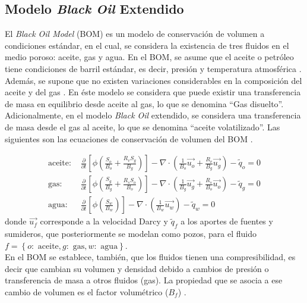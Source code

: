 \subsection[Modelo \emph{Black Oil} Extendido]{Modelo {\normalfont \bfseries \itshape Black Oil} Extendido}\label{subsec:BOM}

El \textit{Black Oil Model} (BOM) es un modelo de conservación de volumen a condiciones estándar, en el cual, se considera la existencia de tres fluidos en el medio poroso: aceite, gas y agua. En el BOM, se asume que el aceite o petróleo tiene condiciones de barril estándar, es decir, presión y temperatura atmosférica \citep{chen2007reservoir}. Además, se supone que no existen variaciones considerables en la composición del aceite y del gas \citep{jamal2006petroleum, chen2007reservoir, ertekin2001basic}. En éste modelo se considera que puede existir una transferencia de masa en equilibrio desde aceite al gas, lo que se denomina ``Gas disuelto''. Adicionalmente, en el modelo \textit{Black Oil} extendido, se considera una transferencia de masa desde el gas al aceite, lo que se denomina ``aceite volatilizado''. Las siguientes son las ecuaciones de conservación de volumen del BOM \citep{jamal2006petroleum, chen2007reservoir, ertekin2001basic}.

\begin{align}
\label{ec:aceite}
\text{aceite: }&\frac{\partial}{\partial t} \left[ \phi \left( \frac{S_{o}}{B_{o}} + \frac{R_{v} S_{g}}{B_{g}} \right) \right]
- \nabla \cdot \left( \frac{1}{B_{o}} \vec{u_{o}} + \frac{R_{v}}{B_{g}} \vec{u_{g}} \right) - \tilde{q}_{o}=0  \\
\label{ec:gas}
\text{gas: }&\frac{\partial}{\partial t} \left[ \phi \left( \frac{S_{g}}{B_{g}} + \frac{R_{s} S_{o}}{B_{o}} \right) \right]
- \nabla \cdot \left( \frac{1}{B_{g}} \vec{u_{g}} + \frac{R_{s}}{B_{o}} \vec{u_{o}} \right) - \tilde{q}_{g} = 0 \\
\label{ec:agua}
\text{agua: }&\frac{\partial}{\partial t} \left[\phi \left( \frac{S_{w}}{B_{w}} \right) \right] - \nabla \cdot \left( \frac{1}{B_{w}} \vec{u_{w}} \right) - \tilde{q}_{w} = 0 
\end{align}
donde $\vec{u_{f}}$ corresponde a la velocidad Darcy y $\tilde{q}_{f}$ a los aportes de fuentes y sumideros, que posteriormente se modelan como pozos, para el fluido $f = \left\lbrace o:\text{ aceite}, g:\text{ gas}, w:\text{ agua} \right\rbrace $.\\

En el BOM se establece, también, que los fluidos tienen una compresibilidad, es decir que cambian su volumen y densidad debido a cambios de presión o transferencia de masa a otros fluidos (gas). La propiedad que se asocia a ese cambio de volumen es el factor volumétrico ($B_{f}$) \citep{chen2007reservoir}.\\


